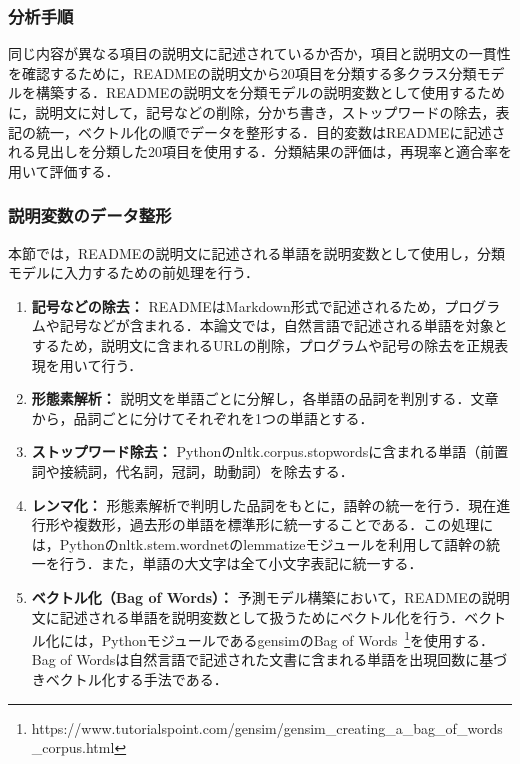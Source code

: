 \documentclass[submit]{ipsj}
\begin{document}
\subsubsection{分析手順}
同じ内容が異なる項目の説明文に記述されているか否か，項目と説明文の一貫性を確認するために，READMEの説明文から20項目を分類する多クラス分類モデルを構築する．READMEの説明文を分類モデルの説明変数として使用するために，説明文に対して，記号などの削除，分かち書き，ストップワードの除去，表記の統一，ベクトル化の順でデータを整形する．目的変数はREADMEに記述される見出しを分類した20項目を使用する．分類結果の評価は，再現率と適合率を用いて評価する．

\subsubsection{説明変数のデータ整形}
本節では，READMEの説明文に記述される単語を説明変数として使用し，分類モデルに入力するための前処理を行う．

\begin{enumerate}
  \item{\textbf{記号などの除去：}}
  READMEはMarkdown形式で記述されるため，プログラムや記号などが含まれる．本論文では，自然言語で記述される単語を対象とするため，説明文に含まれるURLの削除，プログラムや記号の除去を正規表現を用いて行う．
  \item{\textbf{形態素解析：}}
  説明文を単語ごとに分解し，各単語の品詞を判別する．文章から，品詞ごとに分けてそれぞれを1つの単語とする．
  \item{\textbf{ストップワード除去：}}  
  Pythonのnltk.corpus.stopwordsに含まれる単語（前置詞や接続詞，代名詞，冠詞，助動詞）を除去する．
  \item{\textbf{レンマ化：}}
  形態素解析で判明した品詞をもとに，語幹の統一を行う．現在進行形や複数形，過去形の単語を標準形に統一することである．この処理には，Pythonのnltk.stem.wordnetのlemmatizeモジュールを利用して語幹の統一を行う．また，単語の大文字は全て小文字表記に統一する．
  \item{\textbf{ベクトル化（Bag of Words）：}}
  予測モデル構築において，READMEの説明文に記述される単語を説明変数として扱うためにベクトル化を行う．ベクトル化には，PythonモジュールであるgensimのBag of Words~\footnote[5]{https://www.tutorialspoint.com/gensim/gensim\_creating\_a\_bag\_of\_words\_corpus.html}を使用する．Bag of Wordsは自然言語で記述された文書に含まれる単語を出現回数に基づきベクトル化する手法である．
\end{enumerate}
\end{document}
